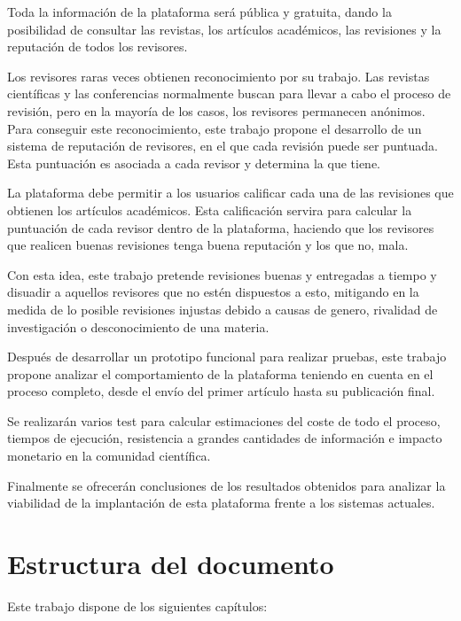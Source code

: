 Toda la información de la plataforma será pública y gratuita, dando la
posibilidad de consultar las revistas, los artículos académicos, las revisiones
y la reputación de todos los revisores.


Los revisores raras veces obtienen reconocimiento por su trabajo. Las revistas
científicas y las conferencias normalmente buscan  para llevar
a cabo el proceso de revisión, pero en la mayoría de los casos, los revisores permanecen anónimos. Para
conseguir este reconocimiento, este trabajo propone el desarrollo de un sistema
de reputación de revisores, en el que cada revisión puede ser puntuada. Esta
puntuación es asociada a cada revisor y determina la  que
tiene.

La plataforma debe permitir a los usuarios calificar cada una de las revisiones
que obtienen los artículos académicos. Esta calificación servira para calcular
la puntuación de cada revisor dentro de la plataforma, haciendo que los
revisores que realicen buenas revisiones tenga buena reputación y los que no,
mala.

Con esta idea, este trabajo pretende  revisiones buenas y entregadas
a tiempo y disuadir a aquellos revisores que no estén dispuestos a esto,
mitigando en la medida de lo posible revisiones injustas debido a causas de
genero, rivalidad de investigación o desconocimiento de una materia.


Después de desarrollar un prototipo funcional para realizar pruebas, este
trabajo propone analizar el comportamiento de la plataforma teniendo en cuenta en el proceso
completo, desde el envío del primer artículo hasta su publicación
final.

Se realizarán varios  test para calcular estimaciones del coste de todo el
proceso, tiempos de ejecución, resistencia a grandes cantidades de información e
impacto monetario en la comunidad científica.

Finalmente se ofrecerán conclusiones de los resultados obtenidos para analizar
la viabilidad de la implantación de esta plataforma frente a los sistemas
actuales.


\section{Estructura del documento}
Este trabajo dispone de los siguientes capítulos:

